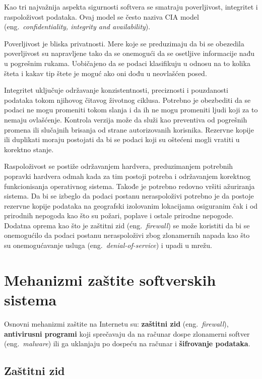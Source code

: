 \documentclass[a4paper]{article}
\begin{document}
Kao tri najvažnija aspekta sigurnosti softvera se smatraju poverljivost, integritet i raspoloživost podataka. Ovaj model se često naziva CIA model (eng.~{\em confidentiality, integrity and availability}).

Poverljivost je bliska privatnosti. Mere koje se preduzimaju da bi se obezedila poverljivost su napravljene tako da se onemogući da se osetljive informacije nađu u pogrešnim rukama. Uobičajeno da se podaci klasifikuju u odnosu na to kolika šteta i kakav tip štete je moguć ako oni dođu u neovlašćen posed.

Integritet uključuje održavanje konzistentnosti, preciznosti i pouzdanosti podataka tokom njihovog čitavog životnog ciklusa. Potrebno je obezbediti da se podaci ne mogu promeniti tokom slanja i da ih ne mogu promeniti ljudi koji za to nemaju ovlašćenje. Kontrola verzija može da služi kao preventiva od pogrešnih promena ili slučajnih brisanja od strane autorizovanih korisnika. Rezervne kopije ili duplikati moraju postojati da bi se podaci koji su oštećeni mogli vratiti u korektno stanje.

Raspoloživost se postiže održavanjem hardvera, preduzimanjem potrebnih popravki hardvera odmah kada za tim postoji potreba i održavanjem korektnog funkcionisanja operativnog sistema. Takođe je potrebno redovno vršiti ažuriranja sistema. Da bi se izbeglo da podaci postanu neraspoloživi potrebno je da postoje rezervne kopije podataka na geografski izolovanim lokacijama osiguranim čak i od prirodnih nepogoda kao što su požari, poplave i ostale prirodne nepogode. Dodatna oprema kao što je zaštitni zid (eng.~{\em firewall}) se može koristiti da bi se onemogućilo da podaci postanu neraspoloživi zbog zlonamernih napada kao što su onemogućavanje usluga (eng.~{\em denial-of-service}) i upadi u mrežu. 


\section{Mehanizmi zaštite softverskih sistema}
\label{sec:mehanizmi zastite softverskih sistema}

Osnovni mehanizmi zaštite na Internetu su: \textbf{zaštitni zid} (eng.~{\em firewall}), \textbf{antivirusni programi} koji sprečavaju da na računar dospe zlonamerni softver (eng.~{\em malware}) ili ga uklanjaju po dospeću na računar i \textbf{šifrovanje podataka}.

\subsection{Zaštitni zid}
\label{subsec:zastitni zid}
\end{document}
